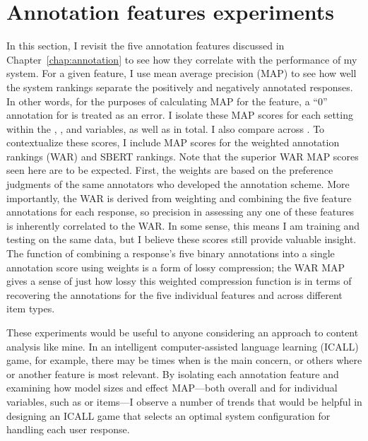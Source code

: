 \section{Annotation features experiments}
\label{sec:exp-annotations}
In this section, I revisit the five annotation features discussed in Chapter~\ref{chap:annotation} to see how they correlate with the performance of my system. For a given feature, I use mean average precision (MAP) to see how well the system rankings separate the positively and negatively annotated responses. In other words, for the purposes of  calculating MAP for the  feature, a ``0'' annotation for  is treated as an error. I isolate these MAP scores for each setting within the , , and  variables, as well as in total. I also compare across . To contextualize these scores, I include MAP scores for the weighted annotation rankings (WAR) and SBERT rankings. Note that the superior WAR MAP scores seen here are to be expected. First, the weights are based on the preference judgments of the same annotators who developed the annotation scheme. More importantly, the WAR is derived from weighting and combining the five feature annotations for each response, so precision in assessing any one of these features is inherently correlated to the WAR. In some sense, this means I am training and testing on the same data, but I believe these scores still provide valuable insight. The function of combining a response's five binary annotations into a single annotation score using weights is a form of lossy compression; the WAR MAP gives a sense of just how lossy this weighted compression function is in terms of recovering the annotations for the five individual features and across different item types. 

These experiments would be useful to anyone considering an approach to content analysis like mine. In an intelligent computer-assisted language learning (ICALL) game, for example, there may be times when  is the main concern, or others where  or another feature is most relevant. By isolating each annotation feature and examining how model sizes and  effect MAP---both overall and for individual variables, such as  or  items---I observe a number of trends that would be helpful in designing an ICALL game that selects an optimal system configuration for handling each user response.

